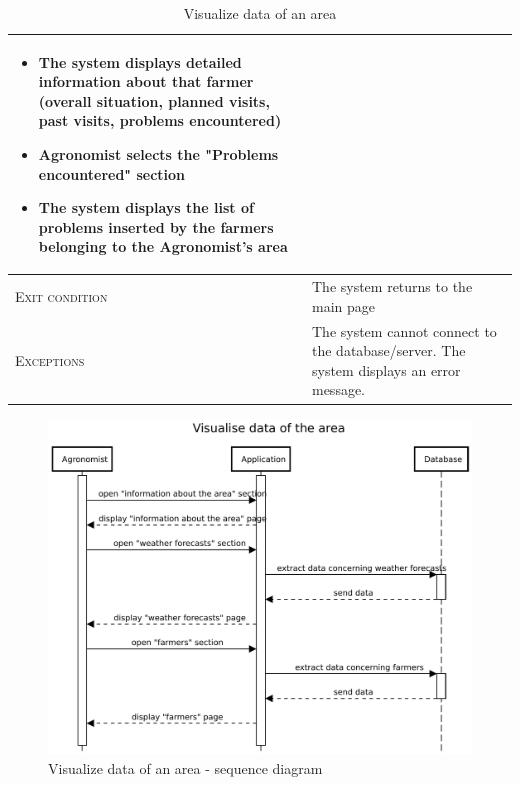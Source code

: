\begin{table}[H]
\begin{tabular}[c]{|l|p{}|}
\begin{itemize}
                                    		\item The system displays detailed information about that farmer (overall situation, planned visits, past visits, problems encountered)
                                    		\item Agronomist selects the "Problems encountered" section
                                    		\item The system displays the list of problems inserted by the farmers belonging to the Agronomist's area
                                        \end{itemize}\\
        \hline %
        \textsc{Exit condition}    &  The system returns to the main page\\
    	\hline %
    	\textsc{Exceptions}         &  The system cannot connect to the database/server. The system displays an error message.
    	\\
    	\hline %
        
    \end{tabular}
    \caption{\label{tab:Area_information_access}Visualize data of an area}
\end{table}

\begin{figure}[H]
    \centering
    \includegraphics[scale=0.65]{Images/Sequence diagrams/Agronomist - visualise data of the area.pdf}
    \caption{Visualize data of an area - sequence diagram}
    \label{fig:my_label}
\end{figure}

